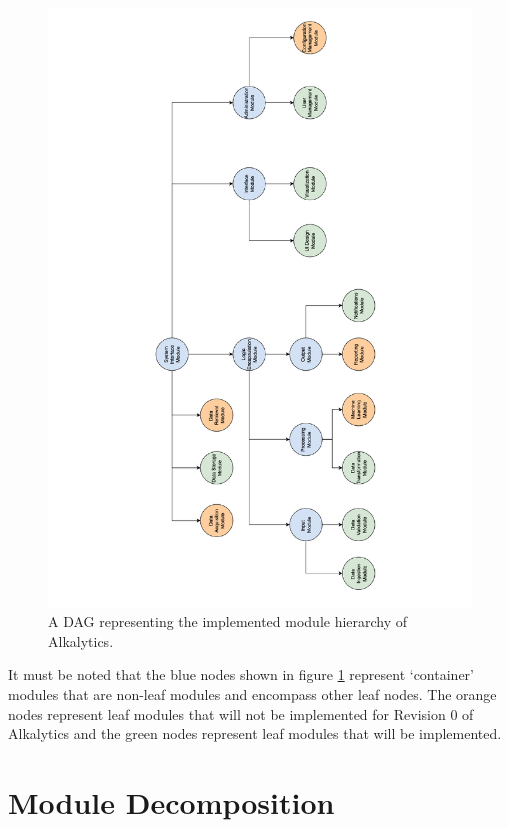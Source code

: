 \documentclass[12pt, titlepage]{article}
\begin{document}
\begin{figure}[htbp]
  \centering
  \includegraphics[scale=0.5,angle=-90]{Diagrams/DAG.pdf}
  \caption{A DAG representing the implemented module hierarchy of Alkalytics.}
  \label{fig:FigMH}
\end{figure}

It must be noted that the blue nodes shown in figure \ref{fig:FigMH} represent 
`container' modules that are non-leaf modules and encompass other leaf nodes.
The orange nodes represent leaf modules that will not be implemented for Revision
0 of Alkalytics and the green nodes represent leaf modules that will be implemented.

\section{Module Decomposition} \label{SecMD}
\end{document}
